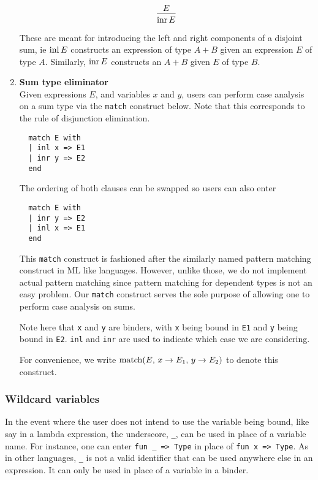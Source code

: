 \documentclass{article}
\begin{document}
\begin{enumerate}
\[
  \begin{prooftree}
    \hypo{E}
    \infer1{\inr E}
  \end{prooftree}
\]

These are meant for introducing the left and right components of a disjoint sum,
ie $\operatorname{inl} E$ constructs an expression of type $A + B$ given an expression $E$ of
type $A$. Similarly, $\operatorname{inr} E$ constructs an $A + B$ given $E$ of type $B$.

\item \textbf{Sum type eliminator} \\
Given expressions $E$, and variables $x$ and $y$, users can perform case analysis
on a sum type via the \verb|match| construct below.
Note that this corresponds to the rule of disjunction elimination.

\begin{verbatim}
  match E with
  | inl x => E1
  | inr y => E2
  end
\end{verbatim}

The ordering of both clauses can be swapped so users can also enter
\begin{verbatim}
  match E with
  | inr y => E2
  | inl x => E1
  end
\end{verbatim}

This \verb|match| construct is fashioned after the similarly named pattern
matching construct in ML like languages.
However, unlike those, we do not implement actual pattern matching since pattern
matching for dependent types is not an easy problem.
Our \verb|match| construct serves the sole purpose of allowing one to perform
case analysis on sums.

Note here that \verb|x| and \verb|y| are binders, with \verb|x| being bound in
\verb|E1| and \verb|y| being bound in \verb|E2|.
\verb|inl| and \verb|inr| are used to indicate which case we are
considering.

For convenience, we write 
$\operatorname{match}(E, \, x \rightarrow E_1, \, y \rightarrow E_2)$ to denote this
construct.

\end{enumerate}

\subsubsection{Wildcard variables}
In the event where the user does not intend to use the variable being bound,
like say in a lambda expression, the underscore, \verb|_|, can be used in place
of a variable name.
For instance, one can enter \verb|fun _ => Type| in place of \verb|fun x => Type|.
As in other languages, \verb|_| is not a valid identifier that can be used
anywhere else in an expression. It can only be used in place of a variable in a
binder.
\end{document}
